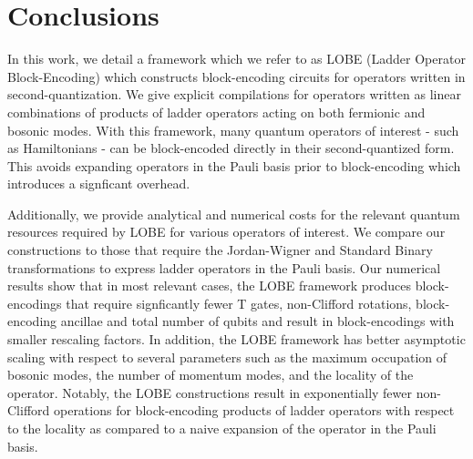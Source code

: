 \section{Conclusions}
\label{sec:conclusions}

In this work, we detail a framework which we refer to as LOBE (Ladder Operator Block-Encoding) which constructs block-encoding circuits for operators written in second-quantization.
We give explicit compilations for operators written as linear combinations of products of ladder operators acting on both fermionic and bosonic modes.
With this framework, many quantum operators of interest - such as Hamiltonians - can be block-encoded directly in their second-quantized form.
This avoids expanding operators in the Pauli basis prior to block-encoding which introduces a signficant overhead.

Additionally, we provide analytical and numerical costs for the relevant quantum resources required by LOBE for various operators of interest.
We compare our constructions to those that require the Jordan-Wigner and Standard Binary transformations to express ladder operators in the Pauli basis.
Our numerical results show that in most relevant cases, the LOBE framework produces block-encodings that require signficantly fewer T gates, non-Clifford rotations, block-encoding ancillae and total number of qubits and result in block-encodings with smaller rescaling factors.
In addition, the LOBE framework has better asymptotic scaling with respect to several parameters such as the maximum occupation of bosonic modes, the number of momentum modes, and the locality of the operator.
Notably, the LOBE constructions result in exponentially fewer non-Clifford operations for block-encoding products of ladder operators with respect to the locality as compared to a naive expansion of the operator in the Pauli basis.

